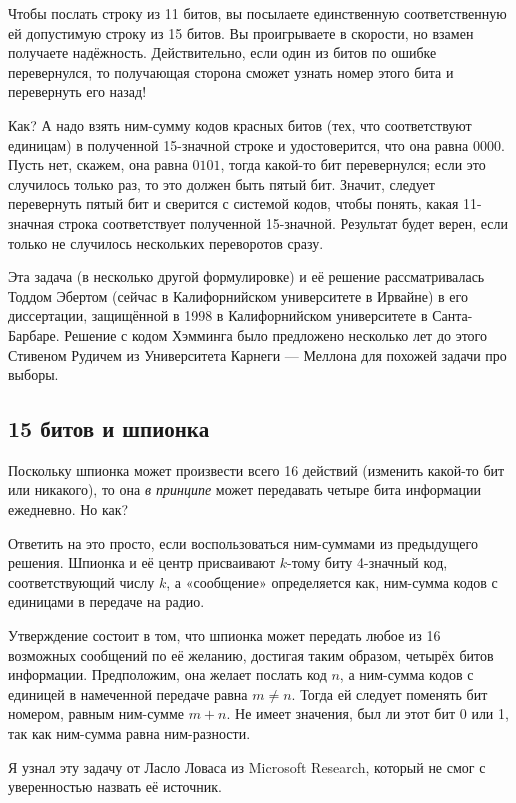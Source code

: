 Чтобы послать строку из 11 битов, вы посылаете единственную соответственную ей допустимую строку из 15 битов.
Вы проигрываете в скорости, но взамен получаете надёжность.
Действительно, если один из битов по ошибке перевернулся, то получающая сторона сможет узнать номер этого бита и перевернуть его назад!

Как? А надо взять ним-сумму кодов красных битов (тех, что соответствуют единицам) в полученной 15-значной строке и удостоверится, что она равна $0000$.
Пусть нет, скажем, она равна $0101$,
тогда какой-то бит перевернулся;
если это случилось только раз, то это должен быть пятый бит.
Значит, следует перевернуть пятый бит и сверится с системой кодов, чтобы понять, какая 11-значная строка соответствует полученной 15-значной.
Результат будет верен, если только не случилось нескольких переворотов сразу.

\medskip

Эта задача (в несколько другой формулировке) и её решение рассматривалась Тоддом Эбертом (сейчас в Калифорнийском университете в Ирвайне) в его диссертации, защищённой в 1998 в Калифорнийском университете в Санта-Барбаре.
Решение с кодом Хэмминга было предложено несколько лет до этого Стивеном Рудичем из Университета Карнеги — Меллона  для похожей задачи про выборы.

\subsection*{15 битов и шпионка}

Поскольку шпионка может произвести всего 16 действий (изменить какой-то бит или никакого), то она \emph{в принципе} может передавать четыре бита информации ежедневно.
Но как?

Ответить на это просто, если воспользоваться ним-суммами из предыдущего решения.
Шпионка и её центр присваивают $k$-тому биту 4-значный код, соответствующий числу $k$, а «сообщение» определяется как, ним-сумма кодов с единицами в передаче на радио.

Утверждение состоит в том, что шпионка может передать любое из 16 возможных сообщений по её желанию,
достигая таким образом, четырёх битов информации.
Предположим, она желает послать код $n$, а ним-сумма кодов с единицей в намеченной передаче равна $m\ne n$.
Тогда ей следует поменять бит номером, равным ним-сумме $m+n$.
Не имеет значения, был ли этот бит 0 или 1, так как ним-сумма равна ним-разности.
\heart

\medskip

Я узнал эту задачу от Ласло Ловаса из Microsoft Research, который не смог с уверенностью назвать её источник.

